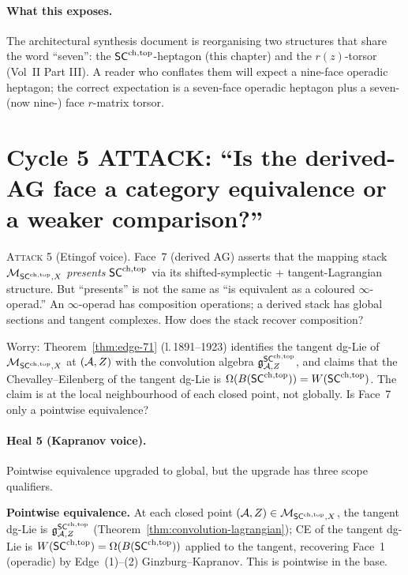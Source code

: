 \paragraph{What this exposes.} The architectural synthesis document is reorganising two structures that share the word ``seven'': the $\mathsf{SC}^{\mathrm{ch},\mathrm{top}}$-heptagon (this chapter) and the $r(z)$-torsor (Vol~II Part III). A reader who conflates them will expect a nine-face operadic heptagon; the correct expectation is a seven-face operadic heptagon plus a seven- (now nine-) face $r$-matrix torsor.

\section{Cycle 5 ATTACK: ``Is the derived-AG face a category equivalence or a weaker comparison?''}

\textsc{Attack 5} (Etingof voice). Face~7 (derived AG) asserts that the mapping stack $\mathcal{M}_{\mathsf{SC}^{\mathrm{ch},\mathrm{top}}, X}$ \emph{presents} $\mathsf{SC}^{\mathrm{ch},\mathrm{top}}$ via its shifted-symplectic + tangent-Lagrangian structure. But ``presents'' is not the same as ``is equivalent as a coloured $\infty$-operad.'' An $\infty$-operad has composition operations; a derived stack has global sections and tangent complexes. How does the stack recover composition?

Worry: Theorem~\ref*{thm:edge-71} (l.\,1891--1923) identifies the tangent dg-Lie of $\mathcal{M}_{\mathsf{SC}^{\mathrm{ch},\mathrm{top}}, X}$ at $(\mathcal{A}, Z)$ with the convolution algebra $\mathfrak{g}^{\mathsf{SC}^{\mathrm{ch},\mathrm{top}}}_{\mathcal{A}, Z}$, and claims that the Chevalley--Eilenberg of the tangent dg-Lie is $\Omega(B(\mathsf{SC}^{\mathrm{ch},\mathrm{top}})) = W(\mathsf{SC}^{\mathrm{ch},\mathrm{top}})$. The claim is at the local neighbourhood of each closed point, not globally. Is Face~7 only a pointwise equivalence?

\paragraph{Heal 5 (Kapranov voice).} Pointwise equivalence upgraded to global, but the upgrade has three scope qualifiers.

\textbf{Pointwise equivalence.} At each closed point $(\mathcal{A}, Z) \in \mathcal{M}_{\mathsf{SC}^{\mathrm{ch},\mathrm{top}}, X}$, the tangent dg-Lie is $\mathfrak{g}^{\mathsf{SC}^{\mathrm{ch},\mathrm{top}}}_{\mathcal{A}, Z}$ (Theorem~\ref*{thm:convolution-lagrangian}); CE of the tangent dg-Lie is $W(\mathsf{SC}^{\mathrm{ch},\mathrm{top}}) = \Omega(B(\mathsf{SC}^{\mathrm{ch},\mathrm{top}}))$ applied to the tangent, recovering Face~1 (operadic) by Edge~(1)--(2) Ginzburg--Kapranov. This is pointwise in the base.

